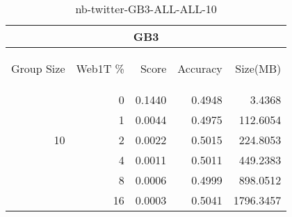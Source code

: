 \begin{center}
\begin{table}[htbp] 
 \begin{center}
\begin{tabular}{ | r | r | r | r | r |}
\hline
\multicolumn{5}{|c|}{GB3}\\
\hline
\begin{sideways}Group Size\end{sideways} & \begin{sideways}Web1T \%\end{sideways} & \begin{sideways}Score\end{sideways} & \begin{sideways}Accuracy\end{sideways} & \begin{sideways}Size(MB)\end{sideways}\\
\hline
\multirow{5}{*}{10}
 & 0 & 0.1440 & 0.4948 & 3.4368\\ \cline{2-5}
 & 1 & 0.0044 & 0.4975 & 112.6054\\ \cline{2-5}
 & 2 & 0.0022 & 0.5015 & 224.8053\\ \cline{2-5}
 & 4 & 0.0011 & 0.5011 & 449.2383\\ \cline{2-5}
 & 8 & 0.0006 & 0.4999 & 898.0512\\ \cline{2-5}
 & 16 & 0.0003 & 0.5041 & 1796.3457\\ \cline{2-5}
\hline
\end{tabular}
\caption{nb-twitter-GB3-ALL-ALL-10}
\label{table:nb-twitter-GB3-ALL-ALL-10}
\end{center}
 \end{table}
\end{center}

